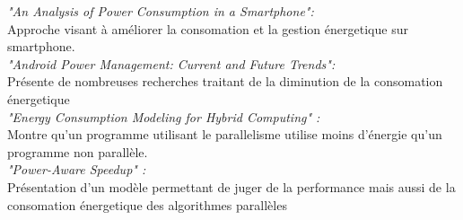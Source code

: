 	\textit {"An Analysis of Power Consumption in a Smartphone":}\cite{ref4}\\
		Approche visant à améliorer la consomation et la gestion énergetique sur smartphone.\\

	\textit {"Android Power Management: Current and Future Trends":}\cite{ref3}\\
		Présente de nombreuses recherches traitant de la diminution de la consomation énergetique \\

	\textit {"Energy Consumption Modeling for Hybrid Computing" :}\cite{ref2}\\
		Montre qu'un programme utilisant le parallelisme utilise moins d'énergie qu'un programme non parallèle.\\

	\textit {"Power-Aware Speedup" :}\cite{ref1}\\
		Présentation d'un modèle permettant de juger de la performance mais aussi de la consomation énergetique des algorithmes parallèles\\